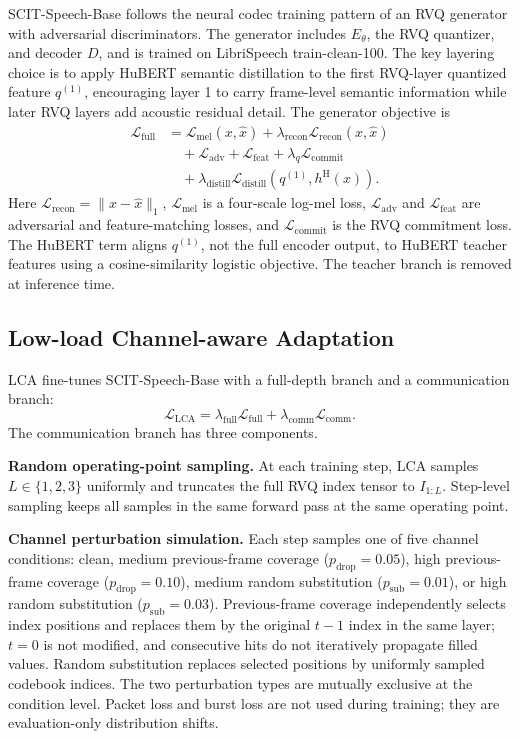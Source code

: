 ﻿\documentclass[conference]{IEEEtran}
\newcommand{\base}{SCIT-Speech-Base}
\begin{document}
\base{} follows the neural codec training pattern of an RVQ generator with adversarial discriminators. The generator includes \(E_\theta\), the RVQ quantizer, and decoder \(D\), and is trained on LibriSpeech train-clean-100. The key layering choice is to apply HuBERT semantic distillation to the first RVQ-layer quantized feature \(q^{(1)}\), encouraging layer 1 to carry frame-level semantic information while later RVQ layers add acoustic residual detail. The generator objective is
\[
\begin{split}
\mathcal{L}_{\mathrm{full}} &=
\mathcal{L}_{\mathrm{mel}}(x,\hat{x})
 + \lambda_{\mathrm{recon}}\mathcal{L}_{\mathrm{recon}}(x,\hat{x}) \\
&\quad + \mathcal{L}_{\mathrm{adv}} + \mathcal{L}_{\mathrm{feat}}
 + \lambda_q \mathcal{L}_{\mathrm{commit}} \\
&\quad + \lambda_{\mathrm{distill}}
 \mathcal{L}_{\mathrm{distill}}(q^{(1)},h^{\mathrm{H}}(x)).
\end{split}
\]
Here \(\mathcal{L}_{\mathrm{recon}}=\|x-\hat{x}\|_1\), \(\mathcal{L}_{\mathrm{mel}}\) is a four-scale log-mel loss, \(\mathcal{L}_{\mathrm{adv}}\) and \(\mathcal{L}_{\mathrm{feat}}\) are adversarial and feature-matching losses, and \(\mathcal{L}_{\mathrm{commit}}\) is the RVQ commitment loss. The HuBERT term aligns \(q^{(1)}\), not the full encoder output, to HuBERT teacher features using a cosine-similarity logistic objective. The teacher branch is removed at inference time.

\subsection{Low-load Channel-aware Adaptation}

LCA fine-tunes \base{} with a full-depth branch and a communication branch:
\[
\mathcal{L}_{\mathrm{LCA}} = \lambda_{\mathrm{full}}\mathcal{L}_{\mathrm{full}}
 + \lambda_{\mathrm{comm}}\mathcal{L}_{\mathrm{comm}}.
\]
The communication branch has three components.

\textbf{Random operating-point sampling.}
At each training step, LCA samples \(L\in\{1,2,3\}\) uniformly and truncates the full RVQ index tensor to \(I_{1:L}\). Step-level sampling keeps all samples in the same forward pass at the same operating point.

\textbf{Channel perturbation simulation.}
Each step samples one of five channel conditions: clean, medium previous-frame coverage (\(p_{\mathrm{drop}}=0.05\)), high previous-frame coverage (\(p_{\mathrm{drop}}=0.10\)), medium random substitution (\(p_{\mathrm{sub}}=0.01\)), or high random substitution (\(p_{\mathrm{sub}}=0.03\)). Previous-frame coverage independently selects index positions and replaces them by the original \(t-1\) index in the same layer; \(t=0\) is not modified, and consecutive hits do not iteratively propagate filled values. Random substitution replaces selected positions by uniformly sampled codebook indices. The two perturbation types are mutually exclusive at the condition level. Packet loss and burst loss are not used during training; they are evaluation-only distribution shifts.
\end{document}
